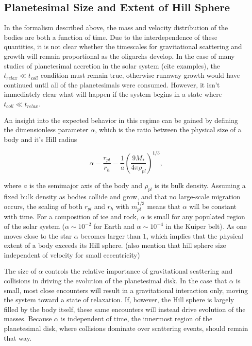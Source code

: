 \documentclass[twocolumn]{aastex63}
\begin{document}
\subsection{Planetesimal Size and Extent of Hill Sphere}

In the formalism described above, the mass and velocity distribution of the bodies are both a function of time. Due to the interdependence of these quantities, it is not clear whether the timescales for gravitational scattering and growth will remain proportional as the oligarchs develop. In the case of many studies of planetesimal accretion in the solar system (cite examples), the $t_{relax} \ll t_{coll}$ condition must remain true, otherwise runaway growth would have continued until all of the planetesimals were consumed. However, it isn't immediately clear what will happen if the system begins in a state where $t_{coll} \ll t_{relax}$.

An insight into the expected behavior in this regime can be gained by defining the dimensionless parameter $\alpha$, which is the ratio between the physical size of a body and it's Hill radius

\begin{equation}\label{eq:alpha}
	\alpha = \frac{r_{pl}}{r_{h}} = \frac{1}{a} \left( \frac{9 M_{*}}{4 \pi \rho_{pl}} \right)^{1/3},
\end{equation}

\noindent where $a$ is the semimajor axis of the body and $\rho_{pl}$ is its bulk density. Assuming a fixed bulk density as bodies collide and grow, and that no large-scale migration occurs, the scaling of both $r_{pl}$ and $r_{h}$ with $m_{pl}^{1/3}$ means that $\alpha$ will be constant with time. For a composition of ice and rock, $\alpha$ is small for any populated region of the solar system ($\alpha \sim 10^{-2}$ for Earth and $\alpha \sim 10^{-4}$ in the Kuiper belt). As one moves close to the star $\alpha$ becomes larger than 1, which implies that the physical extent of a body exceeds its Hill sphere. (also mention that hill sphere size independent of velocity for small eccentricity)

The size of $\alpha$ controls the relative importance of gravitational scattering and collisions in driving the evolution of the planetesimal disk. In the case that $\alpha$ is small, most close encounters will result in a gravitational interaction only, moving the system toward a state of relaxation. If, however, the Hill sphere is largely filled by the body itself, these same encounters will instead drive evolution of the masses. Because $\alpha$ is independent of time, the innermost region of the planetesimal disk, where collisions dominate over scattering events, should remain that way.
\end{document}
